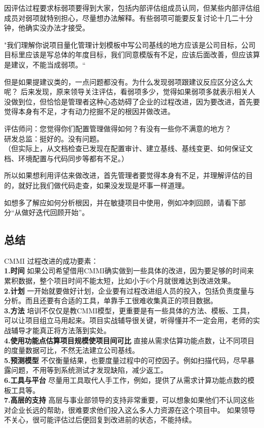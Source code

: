 因评估过程要求标弱项要得到大家，包括内部评估组成员认同，但某些内部评估组成员对弱项就特别担心，尽量想办法解释。有些弱项可能要反复讨论十几二十分钟，他确实没办法才接受。

"我们理解你说项目量化管理计划模板中写公司基线的地方应该是公司目标，公司目标里应该是写总体的年度目标，我们同意模版有不足，应该后面改善，但应该算是建议，不能当成弱项。``

但是如果提建议类的，一点问题都没有。为什么发现弱项跟建议反应区分这么大呢？
后来发现，原来领导关注评估，看弱项多少，觉得如果弱项多就表示相关人没做到位，但恰恰是管理者这种心态妨碍了企业的过程改进，因为要改进，首先要觉得本身有不足，才有动力挖掘不足的根因并做改进。

评估师问：您觉得你们配置管理做得如何？有没有一些你不满意的地方？\\
研发总监：挺好的。没有问题。\\
（但实际上，从文档检查已发现在配置审计、建立基线、基线变更、如何保证文档、环境配置与代码同步等都有不足。）

所以如果想利用评估来做改进，首先管理者要觉得本身有不足，并理解评估的目的，就好比我们做代码走查，如果没发现是坏事一样道理。

如想多了解应如何分析根因，并在敏捷项目中使用，例如冲刺回顾，请看下部分``从做好迭代回顾开始''。

\hypertarget{ux603bux7ed3}{%
\subsection{总结}\label{ux603bux7ed3}}

CMMI 过程改进的成功要素：\\
\textbf{1.时间}
如果公司希望借用CMMI确实做到一些具体的改进，因为要足够的时间来累积数据，整个项目时间不能太短，比如小于6个月就很难达到改进效果。\\
\textbf{2.计划}
一开始就要做好计划，企业要有过程改进组人员的投入，包括负责度量与分析。而且还要有合适的工具，单靠手工很难收集真正的项目数据。\\
\textbf{3.方法}
培训不仅仅是教CMMI模型，更重要是有一些具体的方法、模板、工具，可以让项目组立马用起来。项目实战辅导很关键，听得懂并不一定会用，老师的实战辅导才能真正将方法落到实处。\\
\textbf{4.使用功能点估算项目规模使项目间可比}
直接从需求估算功能点数，让不同项目的度量数据可比，不然无法建立公司基线。\\
\textbf{5.预测模型}
不仅衡量结果，也要度量过程中的可控因子。例如扫描代码，尽早暴露问题，不用等到系统测试才发现缺陷，减少返工。\\
\textbf{6.工具与平台}
尽量用工具取代人手工作，例如，提供了从需求计算功能点数的模板工具等。\\
\textbf{7.高层的支持}
高层与事业部领导的支持非常重要，可以想象如果他们不认同这些对企业长远的帮助，很难要求他们投入这么多人力资源在这个项目中。
如果领导不关心，很可能评估过后便回复到改进前的状态，不能持续。

